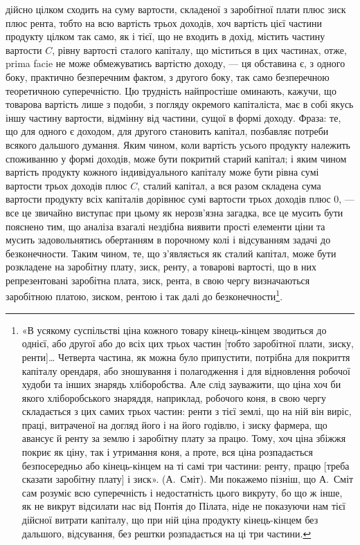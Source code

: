 \parcont{}  %
дійсно цілком сходить на суму вартости, складеної з заробітної плати плюс
зиск плюс рента, тобто на всю вартість трьох доходів, хоч вартість цієї частини
продукту цілком так само, як і тієї, що не входить в дохід, містить частину
вартости \deq{} $C$, рівну вартості сталого капіталу, що міститься в цих частинах,
отже, prima facie не може обмежуватись вартістю доходу, — ця обставина є, з одного
боку, практично безперечним фактом, з другого боку, так само безперечною
теоретичною суперечністю. Цю трудність найпростіше оминають, кажучи, що
товарова вартість лише з подоби, з погляду окремого капіталіста, має в собі
якусь іншу частину вартости, відмінну від частини, сущої в формі доходу.
Фраза: те, що для одного є доходом, для другого становить капітал, позбавляє
потреби всякого дальшого думання. Яким чином, коли вартість усього продукту
належить споживанню у формі доходів, може бути покритий старий капітал; і
яким чином вартість продукту кожного індивідуального капіталу може бути
рівна сумі вартости трьох доходів плюс $C$, сталий капітал, а вся разом складена
сума вартости продукту всіх капіталів дорівнює сумі вартости трьох доходів
плюс 0, — все це звичайно виступає при цьому як нерозв’язна загадка, все це
мусить бути пояснено тим, що аналіза взагалі нездібна виявити прості елементи
ціни та мусить задовольнятись обертанням в порочному колі і відсуванням
задачі до безконечности. Таким чином, те, що з’являється як сталий капітал,
може бути розкладене на заробітну плату, зиск, ренту, а товарові вартості,
що в них репрезентовані заробітна плата, зиск, рента, в свою чергу визначаються
заробітною платою, зиском, рентою і так далі до безконечности\footnote{
«В усякому суспільстві ціна кожного товару кінець-кінцем зводиться до однієї, або другої або до
всіх цих трьох частин [тобто заробітної плати, зиску, ренти]\dots{} Четверта частина, як можна було
припустити, потрібна для покриття капіталу орендаря, або зношування і полагодження і для відновлення
робочої худоби та інших знарядь хліборобства. Але слід зауважити, що ціна хоч би якого
хліборобського знаряддя, наприклад, робочого коня, в свою чергу складається з цих самих трьох
частин: ренти
з тієї землі, що на ній він виріс, праці, витраченої на догляд його і на його годівлю, і зиску
фармера, що авансує й ренту за землю і заробітну плату за працю. Тому, хоч ціна збіжжя покриє як
ціну, так і утримання коня, а проте, вся ціна розпадається безпосередньо або кінець-кінцем на ті
самі три частини: ренту, працю [треба сказати заробітну плату] і зиск». (А.~Сміт). Ми покажемо
пізніш, що А.~Сміт сам розуміє всю суперечність і недостатність цього викруту, бо що ж інше, як не
викрут відсилати
нас від Понтія до Пілата, ніде не показуючи нам тієї дійсної витрати капіталу, що при ній ціна
продукту кінець-кінцем без дальшого, відсування, без рештки розпадається на ці три частини.
}.

